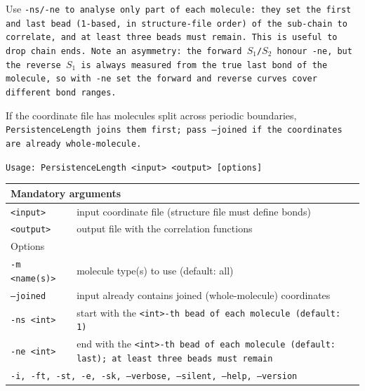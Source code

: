 Use \tt{-ns}/\tt{-ne} to analyse only part of each molecule: they set the first
and last bead (1-based, in structure-file order) of the sub-chain to correlate,
and at least three beads must remain. This is useful to drop chain ends. Note an
asymmetry: the forward $S_1$/$S_2$ honour \tt{-ne}, but the reverse $S_1$ is
always measured from the true last bond of the molecule, so with \tt{-ne} set the
forward and reverse curves cover different bond ranges.

If the coordinate file has molecules split across periodic boundaries,
\tt{PersistenceLength} joins them first; pass \tt{--joined} if the coordinates
are already whole-molecule.


\noindent
\tt{Usage: PersistenceLength <input> <output> [options]}

\noindent
\begin{longtable}{p{}p{}}
  \toprule
  \multicolumn{2}{l}{Mandatory arguments} \\
  \midrule
  \tt{<input>}  & input coordinate file (structure file must define bonds) \\
  \tt{<output>} & output file with the correlation functions \\
  \toprule
  \multicolumn{2}{l}{Options} \\
  \midrule
  \tt{-m <name(s)>} & molecule type(s) to use (default: all) \\
  \tt{--joined}     & input already contains joined (whole-molecule)
                      coordinates \\
  \tt{-ns <int>}    & start with the \tt{<int>}-th bead of each molecule
                      (default: 1) \\
  \tt{-ne <int>}    & end with the \tt{<int>}-th bead of each molecule
                      (default: last); at least three beads must remain \\
  \midrule
  \multicolumn{2}{p{0.948\textwidth}}{\tt{-i}, \tt{-ft}, \tt{-st}, \tt{-e},
    \tt{-sk}, \tt{--verbose}, \tt{--silent}, \tt{--help}, \tt{--version}} \\
  \bottomrule
\end{longtable}

